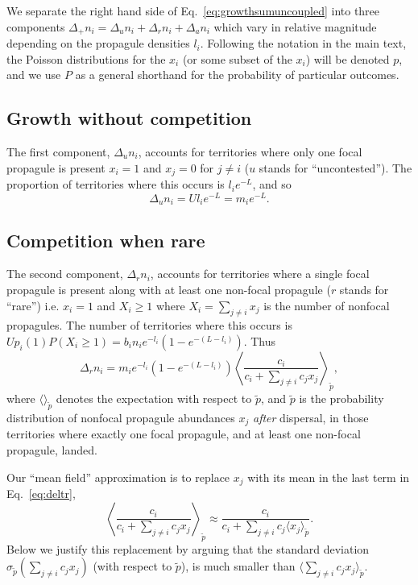\documentclass[11pt]{article}
\begin{document}
We separate the right hand side of Eq.~\eqref{eq:growthsumuncoupled} into three components $\Delta_+ n_i = \Delta_u n_i+\Delta_r n_i+\Delta_a n_i$ which vary in relative magnitude depending on the propagule densities $l_i$. Following the notation in the main text, the Poisson distributions for the $x_i$ (or some subset of the $x_i$) will be denoted $p$, and we use $P$ as a general shorthand for the probability of particular outcomes.

\subsection*{Growth without competition}

The first component, $\Delta_u n_i$, accounts for territories where only one focal propagule is present $x_i=1$ and $x_j=0$ for $j\neq i$ ($u$ stands for ``uncontested''). The proportion of territories where this occurs is $l_i e^{-L}$, and so 
\begin{equation}
\Delta_u n_i=Ul_i e^{-L}=m_i e^{-L}.
\end{equation}

\subsection*{Competition when rare}

The second component, $\Delta_r n_i$, accounts for territories where a single focal propagule is present along with at least one non-focal propagule ($r$ stands for ``rare'') i.e. $x_i=1$ and $X_i\geq 1$ where $X_i=\sum_{j\neq i} x_j$ is the number of nonfocal propagules. The number of territories where this occurs is $Up_i(1)P(X_i\geq 1)=b_i n_i e^{-l_i}(1-e^{-(L-l_i)})$. Thus 
\begin{equation}
\Delta_r n_i = m_i e^{-l_i}(1-e^{-(L-l_i)})\left\langle  \frac{c_i}{c_i +\sum_{j\neq i} c_j x_j } \right\rangle_{\tilde{p}},  \label{eq:deltr}
\end{equation}
where $\langle \rangle_{\tilde{p}}$ denotes the expectation with respect to $\tilde{p}$, and $\tilde{p}$ is the probability distribution of nonfocal propagule abundances $x_j$ \textit{after} dispersal, in those territories where exactly one focal propagule, and at least one non-focal propagule, landed. 

Our ``mean field'' approximation is to replace $x_j$ with its mean in the last term in Eq.~\eqref{eq:deltr},
\begin{equation}
\left\langle\frac{c_i}{c_i +\sum_{j\neq i} c_j x_j}\right\rangle_{\tilde{p}}\approx \frac{c_i}{c_i +\sum_{j\neq i} c_j \langle x_j\rangle_{\tilde{p}}}.\label{eq:meanfieldr}
\end{equation}
Below we justify this replacement by arguing that the standard deviation $\sigma_{\tilde{p}}(\sum_{j\neq i} c_j x_j)$ (with respect to $\tilde{p}$), is much smaller than $\langle\sum_{j\neq i} c_j x_j\rangle_{\tilde{p}}$.
\end{document}
